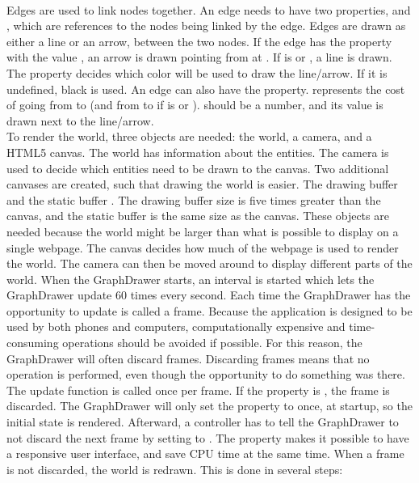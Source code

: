 \\[11pt]
Edges are used to link nodes together. An edge needs to have two properties,  and , which are references to the nodes being linked by the edge. Edges are drawn as either a line or an arrow, between the two nodes. If the edge has the property  with the value , an arrow is drawn pointing from  at . If  is  or , a line is drawn. The  property decides which color will be used to draw the line/arrow. If it is undefined, black is used. An edge can also have the  property.  represents the cost of going from  to  (and from  to  if  is  or ).  should be a number, and its value is drawn next to the line/arrow.
\\[11pt]
To render the world, three objects are needed: the world, a camera, and a HTML5 canvas. The world has information about the entities. The camera is used to decide which entities need to be drawn to the canvas. Two additional canvases are created, such that drawing the world is easier. The drawing buffer  and the static buffer . The drawing buffer size is five times greater than the canvas, and the static buffer is the same size as the canvas. These objects are needed because the world might be larger than what is possible to display on a single webpage. The canvas decides how much of the webpage is used to render the world. The camera can then be moved around to display different parts of the world. When the GraphDrawer starts, an interval is started which lets the GraphDrawer update 60 times every second. Each time the GraphDrawer has the opportunity to update is called a frame. Because the application is designed to be used by both phones and computers, computationally expensive and time-consuming operations should be avoided if possible. For this reason, the GraphDrawer will often discard frames. Discarding frames means that no operation is performed, even though the opportunity to do something was there. The update function is called once per frame. If the  property is , the frame is discarded. The GraphDrawer will only set the  property to  once, at startup, so the initial state is rendered. Afterward, a controller has to tell the GraphDrawer to not discard the next frame by setting  to . The  property makes it possible to have a responsive user interface, and save CPU time at the same time. When a frame is not discarded, the world is redrawn. This is done in several steps:
